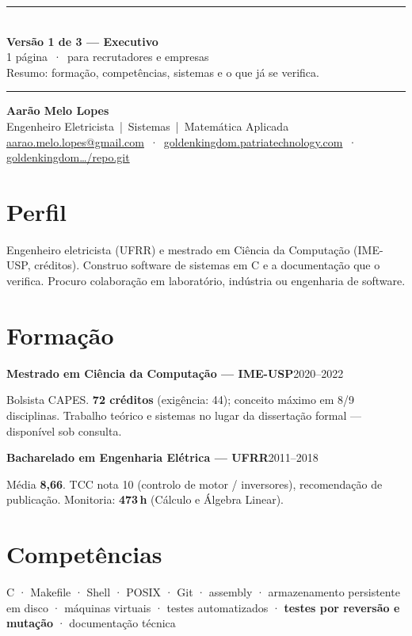 \documentclass[11pt,a4paper]{article}
\newcommand{\lin}[2]{\noindent\textbf{#1}\hfill{\color{cinza}\small #2}\par}
\newcommand{\divisa}[3]{%
  \noindent\rule{\textwidth}{1.2pt}\\[6pt]
  {\large\bfseries #1}\\[2pt]
  {\color{cinza}\small #2}\\[4pt]
  {\small #3}\\[6pt]
  \noindent\rule{\textwidth}{0.4pt}\par
  \vspace{8pt}%
}
\begin{document}
\divisa{Versão 1 de 3 --- Executivo}
{1 página \,·\, para recrutadores e empresas}
{Resumo: formação, competências, sistemas e o que já se verifica.}


\begin{center}
{\LARGE\bfseries Aarão Melo Lopes}\\[1pt]
{\color{cinza}\small Engenheiro Eletricista \,|\, Sistemas \,|\, Matemática Aplicada}\\[1pt]
{\footnotesize
\href{mailto:aarao.melo.lopes@gmail.com}{aarao.melo.lopes@gmail.com}
\,·\,
\href{https://goldenkingdom.patriatechnology.com}{goldenkingdom.patriatechnology.com}
\,·\,
\href{https://goldenkingdom.patriatechnology.com/repo.git}{goldenkingdom\ldots/repo.git}}
\end{center}

\section*{Perfil}

Engenheiro eletricista (UFRR) e mestrado em Ciência da Computação (IME-USP, créditos).
Construo software de sistemas em C e a documentação que o verifica.
Procuro colaboração em laboratório, indústria ou engenharia de software.

\section*{Formação}

\lin{Mestrado em Ciência da Computação --- IME-USP}{2020--2022}
Bolsista CAPES. \textbf{72 créditos} (exigência: 44); conceito máximo em 8/9 disciplinas.
Trabalho teórico e sistemas no lugar da dissertação formal --- disponível sob consulta.

\smallskip
\lin{Bacharelado em Engenharia Elétrica --- UFRR}{2011--2018}
Média \textbf{8{,}66}. TCC nota 10 (controlo de motor / inversores), recomendação de publicação.
Monitoria: \textbf{473\,h} (Cálculo e Álgebra Linear).

\section*{Competências}

{\small C · Makefile · Shell · POSIX · Git · assembly ·
armazenamento persistente em disco · máquinas virtuais ·
testes automatizados · \textbf{testes por reversão e mutação} · documentação técnica}
\end{document}
